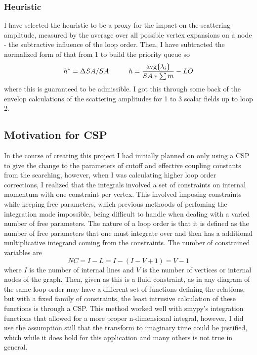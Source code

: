 \documentclass{article}
\begin{document}
\subsubsection{Heuristic}
\hspace{0.5 cm} I have selected the heuristic to be a proxy for the impact on the scattering amplitude, measured by the average over all possible vertex expansions on a node - the subtractive influence of the loop order. Then, I have subtracted the normalized form of that from 1 to build the priority queue so 
\begin{equation}
	h^* = \Delta SA/SA \hspace{1 cm} h= \frac{ \textrm{avg}\{\lambda_i\}}{SA * \sum m} -LO 
\end{equation}
	where this is guaranteed to be admissible. I got this through some back of the envelop calculations of the scattering amplitudes for 1 to 3 scalar fields up to loop 2. 
\subsection{Motivation for CSP}
\hspace{0.5 cm} In the course of creating this project I had initially planned on only using a CSP to give the change to the parameters of cutoff and effective coupling constants from the searching, however, when I was calculating higher loop order corrections, I realized that the integrals involved a set of constraints on internal momentum with one constraint per vertex. This involved imposing constraints while keeping free parameters, which previous methoods of perfoming the integration made impossible, being difficult to handle when dealing with a varied number of free parameters. The nature of a loop order is that it is defined as the number of free parameters that one must integrate over and then has a additional multiplicative integrand coming from the constraints. The number of constrained variables are 
\begin{equation}
	NC=I-L = I-(I-V+1)= V-1
\end{equation}
where $I$ is the number of internal lines and $V$ is the number of vertices or internal nodes of the graph. 
Then, given as this is a fluid constraint, as in any diagram of the same loop order may have a different set of functions defining the relations, but with a fixed family of constraints, the least intrusive calculation of these functions is through a CSP. This method worked well with smypy's integration functions that allowed for a more proper n-dimensional integral, however, I did use the assumption still that the transform to imaginary time could be justified, which while it does hold for this application and many others is not true in general. 
\end{document}
